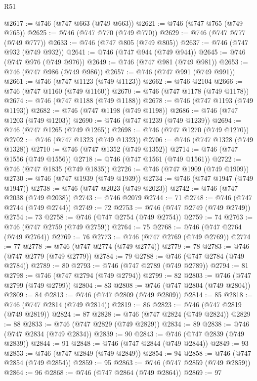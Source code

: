\begin{lexlean}{R51}
\begin{coremodule}
@2617 := @746 (@747 @663 (@749 @663))
@2621 := @746 (@747 @765 (@749 @765))
@2625 := @746 (@747 @770 (@749 @770))
@2629 := @746 (@747 @777 (@749 @777))
@2633 := @746 (@747 @805 (@749 @805))
@2637 := @746 (@747 @932 (@749 @932))
@2641 := @746 (@747 @944 (@749 @944))
@2645 := @746 (@747 @976 (@749 @976))
@2649 := @746 (@747 @981 (@749 @981))
@2653 := @746 (@747 @986 (@749 @986))
@2657 := @746 (@747 @991 (@749 @991))
@2661 := @746 (@747 @1123 (@749 @1123))
@2662 := @746 @2104
@2666 := @746 (@747 @1160 (@749 @1160))
@2670 := @746 (@747 @1178 (@749 @1178))
@2674 := @746 (@747 @1188 (@749 @1188))
@2678 := @746 (@747 @1193 (@749 @1193))
@2682 := @746 (@747 @1198 (@749 @1198))
@2686 := @746 (@747 @1203 (@749 @1203))
@2690 := @746 (@747 @1239 (@749 @1239))
@2694 := @746 (@747 @1265 (@749 @1265))
@2698 := @746 (@747 @1270 (@749 @1270))
@2702 := @746 (@747 @1323 (@749 @1323))
@2706 := @746 (@747 @1328 (@749 @1328))
@2710 := @746 (@747 @1352 (@749 @1352))
@2714 := @746 (@747 @1556 (@749 @1556))
@2718 := @746 (@747 @1561 (@749 @1561))
@2722 := @746 (@747 @1835 (@749 @1835))
@2726 := @746 (@747 @1909 (@749 @1909))
@2730 := @746 (@747 @1939 (@749 @1939))
@2734 := @746 (@747 @1947 (@749 @1947))
@2738 := @746 (@747 @2023 (@749 @2023))
@2742 := @746 (@747 @2038 (@749 @2038))
@2743 := @746 @2079
@2744 := 71
@2748 := @746 (@747 @2744 (@749 @2744))
@2749 := 72
@2753 := @746 (@747 @2749 (@749 @2749))
@2754 := 73
@2758 := @746 (@747 @2754 (@749 @2754))
@2759 := 74
@2763 := @746 (@747 @2759 (@749 @2759))
@2764 := 75
@2768 := @746 (@747 @2764 (@749 @2764))
@2769 := 76
@2773 := @746 (@747 @2769 (@749 @2769))
@2774 := 77
@2778 := @746 (@747 @2774 (@749 @2774))
@2779 := 78
@2783 := @746 (@747 @2779 (@749 @2779))
@2784 := 79
@2788 := @746 (@747 @2784 (@749 @2784))
@2789 := 80
@2793 := @746 (@747 @2789 (@749 @2789))
@2794 := 81
@2798 := @746 (@747 @2794 (@749 @2794))
@2799 := 82
@2803 := @746 (@747 @2799 (@749 @2799))
@2804 := 83
@2808 := @746 (@747 @2804 (@749 @2804))
@2809 := 84
@2813 := @746 (@747 @2809 (@749 @2809))
@2814 := 85
@2818 := @746 (@747 @2814 (@749 @2814))
@2819 := 86
@2823 := @746 (@747 @2819 (@749 @2819))
@2824 := 87
@2828 := @746 (@747 @2824 (@749 @2824))
@2829 := 88
@2833 := @746 (@747 @2829 (@749 @2829))
@2834 := 89
@2838 := @746 (@747 @2834 (@749 @2834))
@2839 := 90
@2843 := @746 (@747 @2839 (@749 @2839))
@2844 := 91
@2848 := @746 (@747 @2844 (@749 @2844))
@2849 := 93
@2853 := @746 (@747 @2849 (@749 @2849))
@2854 := 94
@2858 := @746 (@747 @2854 (@749 @2854))
@2859 := 95
@2863 := @746 (@747 @2859 (@749 @2859))
@2864 := 96
@2868 := @746 (@747 @2864 (@749 @2864))
@2869 := 97

\end{coremodule}
\end{lexlean}
